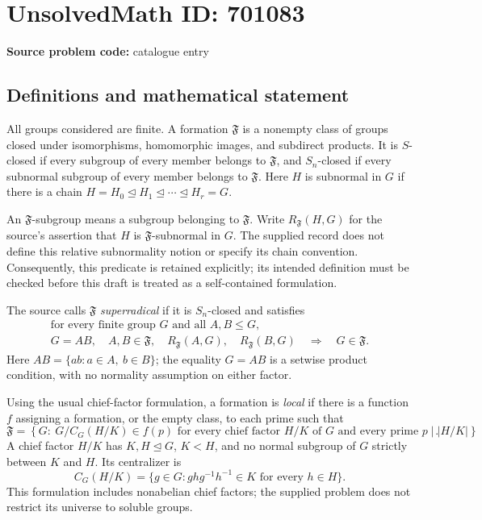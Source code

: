 \documentclass[11pt]{article}
\begin{document}
\section*{UnsolvedMath ID: 701083}
\textbf{Source problem code:} catalogue entry
\subsection{Definitions and mathematical statement}
All groups considered are finite. A formation \(\mathfrak F\) is a nonempty class of groups closed under isomorphisms, homomorphic images, and subdirect products. It is \(S\)-closed if every subgroup of every member belongs to \(\mathfrak F\), and \(S_n\)-closed if every subnormal subgroup of every member belongs to \(\mathfrak F\). Here \(H\) is subnormal in \(G\) if there is a chain \(H=H_0\trianglelefteq H_1\trianglelefteq\cdots\trianglelefteq H_r=G\).

An \(\mathfrak F\)-subgroup means a subgroup belonging to \(\mathfrak F\). Write \(R_{\mathfrak F}(H,G)\) for the source's assertion that \(H\) is \(\mathfrak F\)-subnormal in \(G\). The supplied record does not define this relative subnormality notion or specify its chain convention. Consequently, this predicate is retained explicitly; its intended definition must be checked before this draft is treated as a self-contained formulation.

The source calls \(\mathfrak F\) \emph{superradical} if it is \(S_n\)-closed and satisfies
\[
\begin{gathered}
\text{for every finite group }G\text{ and all }A,B\leq G,\\
G=AB,\quad A,B\in\mathfrak F,\quad
R_{\mathfrak F}(A,G),\quad R_{\mathfrak F}(B,G)
\quad\Longrightarrow\quad G\in\mathfrak F.
\end{gathered}
\]
Here \(AB=\{ab:a\in A,\ b\in B\}\); the equality \(G=AB\) is a setwise product condition, with no normality assumption on either factor.

Using the usual chief-factor formulation, a formation is \emph{local} if there is a function \(f\) assigning a formation, or the empty class, to each prime such that
\[
\mathfrak F=
\left\{G:\ 
G/C_G(H/K)\in f(p)
\text{ for every chief factor }H/K\text{ of }G
\text{ and every prime }p\mid |H/K|
\right\}.
\]
A chief factor \(H/K\) has \(K,H\trianglelefteq G\), \(K<H\), and no normal subgroup of \(G\) strictly between \(K\) and \(H\). Its centralizer is
\[
C_G(H/K)=\{g\in G:ghg^{-1}h^{-1}\in K\text{ for every }h\in H\}.
\]
This formulation includes nonabelian chief factors; the supplied problem does not restrict its universe to soluble groups.
\end{document}
